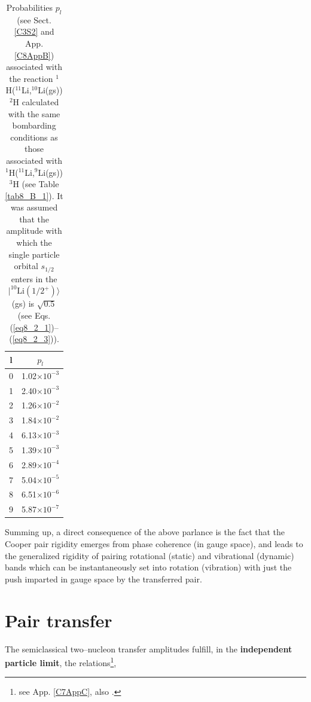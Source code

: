   \begin{table}
  \begin{tabular}{|c|c|}
  \hline  l & $p_l$ \\ 
\hline  0 & 1.02$\times 10^{-3}$ \\ 
\hline  1 & 2.40$\times 10^{-3}$ \\ 
\hline  2 &  1.26$\times 10^{-2}$ \\ 
\hline  3 &  1.84$\times 10^{-2}$ \\ 
\hline  4 &  6.13$\times 10^{-3}$\\ 
\hline  5 &  1.39$\times 10^{-3}$\\ 
\hline  6 &  2.89$\times 10^{-4}$\\ 
\hline  7 &  5.04$\times 10^{-5}$\\ 
\hline  8 &  6.51$\times 10^{-6}$\\ 
\hline  9 &  5.87$\times 10^{-7}$\\
\hline
  \end{tabular}\caption{Probabilities $p_l$ (see Sect. \ref{C3S2} and App. \ref{C8AppB}) associated with the reaction $^1$H($^{11}$Li,$^{10}$Li(gs))$^2$H calculated with the same bombarding conditions as those associated with $^1$H($^{11}$Li,$^{9}$Li(gs))$^3$H (see Table \ref{tab8_B_1}). It was assumed that the amplitude with which the single particle orbital $s_{1/2}$ enters in the $|^{10}\text{Li}(1/2^+)\rangle$ (gs) is $\sqrt{0.5}$ (see Eqs. (\ref{eq8_2_1})--(\ref{eq8_2_3})).}\label{tab3.3.1}
  \end{table}

Summing up, a direct consequence of the above parlance is the fact that the Cooper pair rigidity emerges from phase coherence (in gauge space), and leads to the generalized rigidity of pairing rotational (static) and vibrational (dynamic) bands which can be instantaneously set into rotation (vibration) with just the push imparted in gauge space by the transferred pair.








\section{Pair transfer}\label{trans_nutAppA}
The semiclassical two--nucleon transfer amplitudes fulfill, in the \textbf{independent particle limit}, the relations\footnote{see App. \ref{C7AppC}, also \cite{Potel:13}.},




